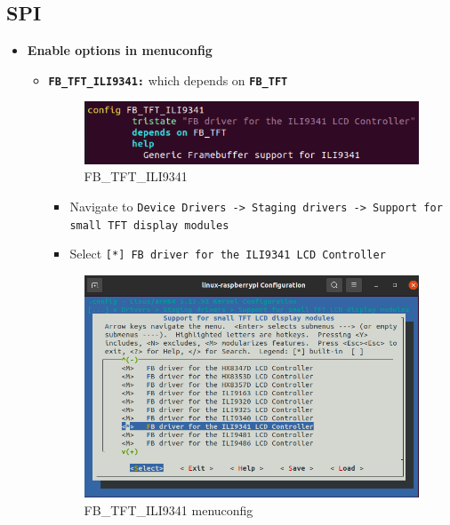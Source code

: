 \documentclass{article}
\begin{document}
\subsection{SPI}
\begin{itemize}
    \item \textbf{Enable options in menuconfig}

    \begin{itemize}
        \item \texttt{\textbf{FB\_TFT\_ILI9341:}} which depends on \texttt{\textbf{FB\_TFT}}
        \begin{figure}[H]
            \centering
            \includegraphics[width=0.5\linewidth]{FB_TFT_ILI9341.png}
            \caption{FB\_TFT\_ILI9341}
            \label{fig:fb_tft_ili9341}
        \end{figure}
        \begin{itemize}
            \item Navigate to \texttt{Device Drivers -> Staging drivers -> Support for small TFT display modules}
            \item Select \texttt{[*] FB driver for the ILI9341 LCD Controller}
        \end{itemize}
        \begin{figure}[H]
            \centering
            \includegraphics[width=0.5\linewidth]{FB_TFT_ILI9341_menuconfig.png}
            \caption{FB\_TFT\_ILI9341 menuconfig}
            \label{fig:fb_tft_ili9341_menuconfig}
        \end{figure}


\end{itemize}
\end{itemize}
\end{document}
